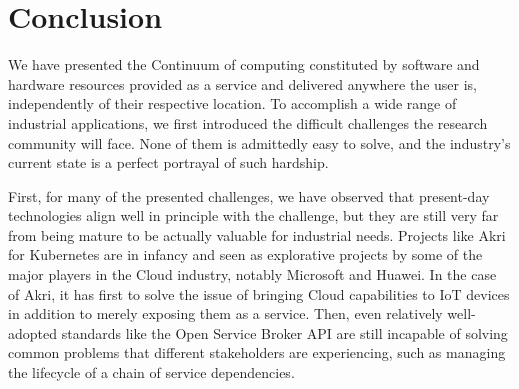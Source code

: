 


\section{Conclusion}
\label{sec:conclusion}

We have presented the Continuum of computing constituted by software and hardware resources provided as a service and delivered anywhere the user is, independently of their respective location. To accomplish a wide range of industrial applications, we first introduced the difficult challenges the research community will face. None of them is admittedly easy to solve, and the industry's current state is a perfect portrayal of such hardship.

First, for many of the presented challenges, we have observed that present-day technologies align well in principle with the challenge, but they are still very far from being mature to be actually valuable for industrial needs. Projects like Akri for Kubernetes are in infancy and seen as explorative projects by some of the major players in the Cloud industry, notably Microsoft and Huawei. In the case of Akri, it has first to solve the issue of bringing Cloud capabilities to IoT devices in addition to merely exposing them as a service.
Then, even relatively well-adopted standards like the Open Service Broker API are still incapable of solving common problems that different stakeholders are experiencing, such as managing the lifecycle of a chain of service dependencies.

